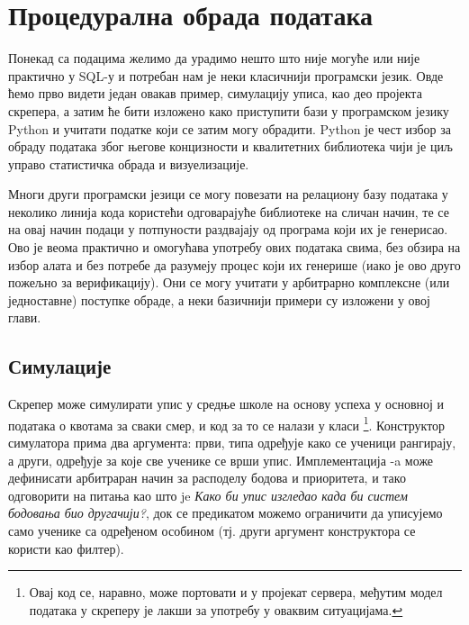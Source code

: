 \chapter{Процедурална обрада података}\label{ch:\thechapter}

Понекад са подацима желимо да урадимо нешто што није могуће или није практично у SQL-у и потребан нам је неки класичнији програмски језик. Овде ћемо прво видети један овакав пример, симулацију уписа, као део пројекта скрепера, а затим ће бити изложено како приступити бази у програмском језику Python и учитати податке који се затим могу обрадити. Python је чест избор за обраду података због његове концизности и квалитетних библиотека чији је циљ управо статистичка обрада и визуелизације. 

Многи други програмски језици се могу повезати на релациону базу података у неколико линија кода користећи одговарајуће библиотеке на сличан начин, те се на овај начин подаци у потпуности раздвајају од програма који их је генерисао. Ово је веома практично и омогућава употребу ових података свима, без обзира на избор алата и без потребе да разумеју процес који их генерише (иако је ово друго пожељно за верификацију). Они се могу учитати у арбитрарно комплексне (или једноставне) поступке обраде, а неки базичнији примери су изложени у овој глави.

\section{Симулације}

Скрепер може симулирати упис у средње школе на основу успеха у основној и података о квотама за сваки смер, и код за то се налази у класи \footnote{Овај код се, наравно, може портовати и у пројекат сервера, међутим модел података у скреперу је лакши за употребу у оваквим ситуацијама.}. Конструктор симулатора прима два аргумента: први, типа  одређује како се ученици рангирају, а други,  одређује за које све ученике се врши упис. Имплементација -a може дефинисати арбитраран начин за расподелу бодова и приоритета, и тако одговорити на питања као што je \emph{Како би упис изгледао када би систем бодовања био другачији?}, док се предикатом можемо ограничити да уписујемо само ученике са одређеном особином (тј. други аргумент конструктора се користи као филтер). 

